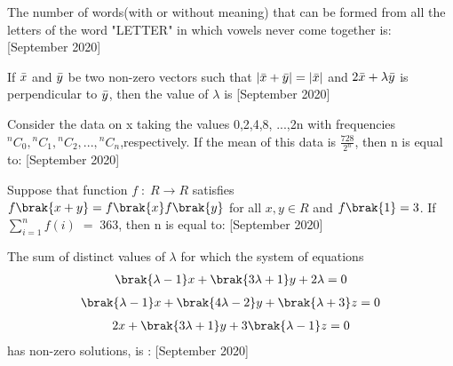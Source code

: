 \iffalse
\title{2020}
\author{EE24BTECH11063}
\section{integer}
\fi
\item The number of words(with or without meaning) that can be formed from all the letters of the word "LETTER" in which vowels never come together is: \hfill{[September 2020]}
 \item If $\Bar{x}$ and $\Bar{y}$ be two non-zero vectors such that $|\Bar{x}+\Bar{y}|=|\Bar{x}|$ and $2\Bar{x}+\lambda \Bar{y}$ is perpendicular to $\Bar{y}$, then the value of $\lambda$ is \hfill{[September 2020]}
 \item Consider the data on x taking the values 0,2,4,8, ...,2n with frequencies ${}^{n}C_{0}
,{}^{n}C_{1},{}^{n}C_{2}, ...,{}^{n}C_{n}$,respectively. If the mean of this data is $\frac{728}{2^n}$, then n is equal to: \hfill{[September 2020]}
 \item Suppose that function $f\;:\;R\rightarrow R$ satisfies $f\brak{x+y}=f\brak{x}f\brak{y}$ for all $x,y \in R$ and $f\brak{1}=3$. If $\sum_{i=1}^{n} f(i)\;=\;363$, then n is equal to: \hfill{[September 2020]}

 \item The sum of distinct values of $\lambda$ for which the system of equations 
 \begin{align*}
     \brak{\lambda -1}x +\brak{3\lambda+1}y+2\lambda =0
 \end{align*}
 \begin{align*}
     \brak{\lambda -1}x +\brak{4\lambda-2}y+\brak{\lambda+3}z =0
 \end{align*}
 \begin{align*}
     2x +\brak{3\lambda+1}y+3\brak{\lambda-1}z =0
 \end{align*}
 has non-zero solutions, is : \hfill{[September 2020]}
